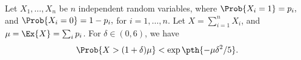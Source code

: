\begin{lemma}
        Let $X_1, \ldots, X_n$ be $n$ independent random variables,
        where
        \begin{math}
            \Prob{  X_i = 1 } =p_i,
        \end{math}
        and
        \begin{math}
            \Prob{  X_i = 0 } =1- p_i,
        \end{math}
        for $i=1,\ldots, n$.  Let $X = \sum_{i=1}^{n} X_i$, and
        $\mu = \Ex{\bigl. X} = \sum_i p_i$.  For $\delta \in (0,6)$, we have
        \begin{equation*}
            \Prob{ \bigl. X > (1+\delta)\mu } < \exp \pth{-\mu \delta^2 /
               5}.
        \end{equation*}
    \end{lemma}
